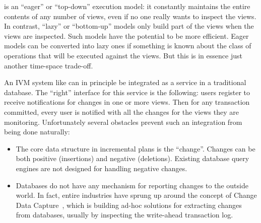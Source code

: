 \dbsp is an ``eager'' or ``top-down'' execution model: it constantly
maintains the entire contents of any number of views, even if no one
really wants to inspect the views.  In contrast, ``lazy'' or
``bottom-up'' models only build part of the views when the views are
inspected.  Such models have the potential to be more efficient.
Eager models can be converted into lazy ones if something is known
about the class of operations that will be executed against the views.
But this is in essence just another time-space trade-off.

An IVM system like \dbsp can in principle be integrated as a service
in a traditional database.  The ``right'' interface for this service
is the following: users register to receive notifications for changes
in one or more views.  Then for any transaction committed, every user
is notified with all the changes for the views they are monitoring.
Unfortunately several obstacles prevent such an integration from being
done naturally:
\begin{itemize}
  \item The core data structure in incremental plans is the
    ``change''.  Changes can be both positive (insertions) and
    negative (deletions).  Existing database query engines are not
    designed for handling negative changes.
  \item Databases do not have any mechanism for reporting changes to
    the outside world.  In fact, entire industries have sprung up
    around the concept of Change Data Capture~\cite{cdc}, which is
    building ad-hoc solutions for extracting changes from databases,
    usually by inspecting the write-ahead transaction log.
\end{itemize}

